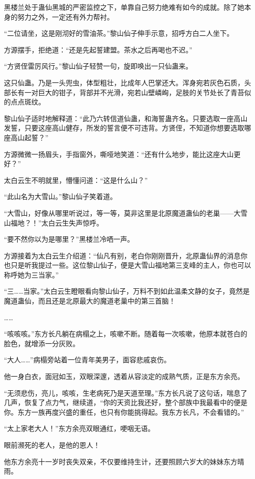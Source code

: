 \begin{this_body}
黑楼兰处于蛊仙黑城的严密监控之下，单靠自己努力绝难有如今的成就。除了她本身的努力之外，一定还有外力帮衬。

“二位请坐，这是刚沏好的雪油茶。”黎山仙子伸手示意，招呼方白二人坐下。

方源摆手，拒绝道：“还是先起誓建盟。茶水之后再喝也不迟。”

“方贤侄雷厉风行。”黎山仙子轻赞一句，旋即唤出一只仙蛊来。

这只仙蛊。乃是一头兜虫，体型粗壮，比成年人巴掌还大。浑身宛若灰色石质，头部长有一对巨大的钳子，背部并不光滑，宛若山壁嶙峋，足肢的关节处长了青苔似的点点斑纹。

黎山仙子适时地解释道：“此乃六转信道仙蛊，和海誓蛊齐名。只要选取一座高山发誓，只要这座高山健存，所发的誓言便不可违背。方贤侄，不知道你想要选取哪座高山起誓？”

方源微微一扬眉头，手指窗外，嘶哑地笑道：“还有什么地步，能比这座大山更好？”

太白云生不明就里，懵懂问道：“这是什么山？”

“此山名为大雪山。”黎山仙子笑着道。

“大雪山，好像从哪里听说过，等一等，莫非这里是北原魔道蛊仙的老巢——大雪山福地？！”太白云生失声惊呼。

“要不然你以为是哪里？”黑楼兰冷哂一声。

方源接着为太白云生介绍道：“仙凡有别，老白你刚刚晋升，北原蛊仙界的消息你也只是听我提过一些。这位黎山仙子，便是大雪山福地第三支峰的主人，你也可以称呼她为三当家。”

“三……当家。”太白云生瞪眼看向黎山仙子，万料不到如此温柔文静的女子，竟然是魔道蛊仙，而且还是北原最大的魔道老巢中的第三首脑！

……

“咳咳咳。”东方长凡躺在病榻之上，咳嗽不断。随着每一次咳嗽，他原本就苍白的脸色，就增添一分灰败。

“大人……”病榻旁站着一位青年美男子，面容悲戚哀伤。

他一身白衣，面冠如玉，双眼深邃，透着从容淡定的成熟气质，正是东方余亮。

“无须悲伤，亮儿，咳咳，生老病死乃是天道至理。”东方长凡说了这句话，喘息了几声，恢复了点力气，继续道，“你的天资比我还好，整个部族中我最看中的便是你。东方一族再度兴盛的重任，也只有你能挑得起。我东方长凡，不会看错的。”

“太上家老大人！”东方余亮双眼通红，哽咽无语。

眼前濒死的老人，是他的恩人！

他东方余亮十一岁时丧失双亲，不仅要维持生计，还要照顾六岁大的妹妹东方晴雨。


\end{this_body}
